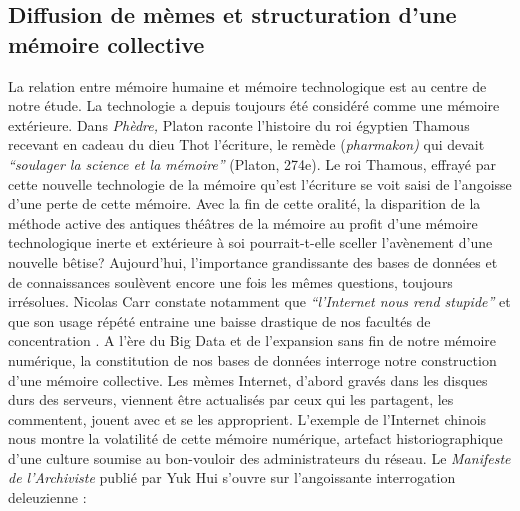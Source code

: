 \subsection[Diffusion de m\`emes et structuration d{\textquoteright}une m\'emoire collective]{Diffusion de m\`emes et structuration d{\textquoteright}une m\'emoire collective}
La relation entre m\'emoire humaine et m\'emoire technologique est au centre de notre \'etude. La technologie a depuis toujours \'et\'e consid\'er\'e comme une m\'emoire ext\'erieure. Dans \textit{Ph\`edre, }Platon raconte l{\textquoteright}histoire du roi \'egyptien Thamous recevant en cadeau du dieu Thot l{\textquoteright}\'ecriture, le rem\`ede (\textit{pharmakon) }qui devait \textit{{\textquotedblleft}soulager la science et la m\'emoire{\textquotedblright} }(Platon, 274e). Le roi Thamous, effray\'e par cette nouvelle technologie de la m\'emoire qu{\textquoteright}est l{\textquoteright}\'ecriture se voit saisi de l{\textquoteright}angoisse d{\textquoteright}une perte de cette m\'emoire. Avec la fin de cette oralit\'e, la disparition de la m\'ethode active des antiques th\'e\^atres de la m\'emoire au profit d{\textquoteright}une m\'emoire technologique inerte et ext\'erieure \`a soi pourrait-t-elle sceller l{\textquoteright}av\`enement d{\textquoteright}une nouvelle b\^etise? Aujourd{\textquoteright}hui, l{\textquoteright}importance grandissante des bases de donn\'ees et de connaissances soul\`event encore une fois les m\^emes questions, toujours irr\'esolues. Nicolas Carr constate notamment que \textit{{\textquotedblleft}l{\textquoteright}Internet nous rend stupide{\textquotedblright}} et que son usage r\'ep\'et\'e entraine une baisse drastique de nos facult\'es de concentration \citep{Carr2010}. A l{\textquoteright}\`ere du Big Data et de l{\textquoteright}expansion sans fin de notre m\'emoire num\'erique, la constitution de nos bases de donn\'ees interroge notre construction d{\textquoteright}une m\'emoire collective. Les m\`emes Internet, d{\textquoteright}abord grav\'es dans les disques durs des serveurs, viennent \^etre actualis\'es par ceux qui les partagent, les commentent, jouent avec et se les approprient. L{\textquoteright}exemple de l{\textquoteright}Internet chinois nous montre la volatilit\'e de cette m\'emoire num\'erique, artefact historiographique d{\textquoteright}une culture soumise au bon-vouloir des administrateurs du r\'eseau. Le \textit{Manifeste de l{\textquoteright}Archiviste} publi\'e par Yuk Hui \citeyear{Hui2014} s{\textquoteright}ouvre sur l{\textquoteright}angoissante interrogation deleuzienne :  

